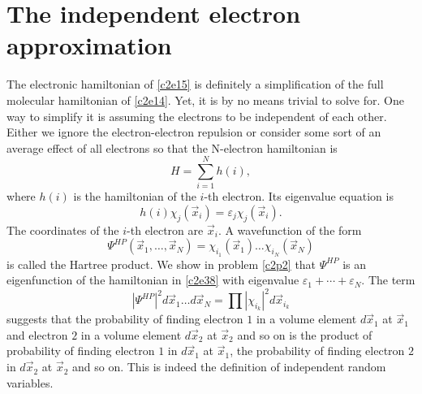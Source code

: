 \section{The independent electron approximation}\label{c2s5}
The electronic hamiltonian of \eqref{c2e15} is definitely a simplification of 
the full molecular hamiltonian of \eqref{c2e14}. Yet, it is by no means trivial
to solve for. One way to simplify it is assuming the electrons to be 
independent of each other. Either we ignore the electron-electron repulsion or
consider some sort of an average effect of all electrons so that the N-electron
hamiltonian is
\begin{equation}\label{c2e38}
H = \sum_{i=1}^N h(i),
\end{equation}
where $h(i)$ is the hamiltonian of the $i$-th electron. Its eigenvalue equation
is
\begin{equation}\label{c2e39}
h(i)\chi_j(\vec{x}_i) = \varepsilon_j\chi_j(\vec{x}_i).
\end{equation}
The coordinates of the $i$-th electron are $\vec{x}_i$. A wavefunction of the
form
\begin{equation}\label{c2e40}
\Psi^{HP}(\vec{x}_1, \ldots, \vec{x}_N) = \chi_{i_1}(\vec{x}_1)\ldots
\chi_{i_N}(\vec{x}_N)
\end{equation}
is called the Hartree product. We show in problem \ref{c2p2} that $\Psi^{HP}$ 
is an eigenfunction of the hamiltonian in \eqref{c2e38} with eigenvalue 
$\varepsilon_1 + \cdots + \varepsilon_N$. The term
\[
|\Psi^{HP}|^2 d\vec{x}_1\ldots d\vec{x}_N = \prod|\chi_{i_k}|^2d\vec{x}_{i_k}
\]
suggests that the probability of finding electron $1$ in a volume element
$d\vec{x}_1$ at $\vec{x}_1$ and electron $2$ in a volume element $d\vec{x}_2$
at $\vec{x}_2$ and so on is the product of probability of finding electron $1$
in $d\vec{x}_1$ at $\vec{x}_1$, the probability of finding electron $2$ in 
$d\vec{x}_2$ at $\vec{x}_2$ and so on. This is indeed the definition of
independent random variables.

